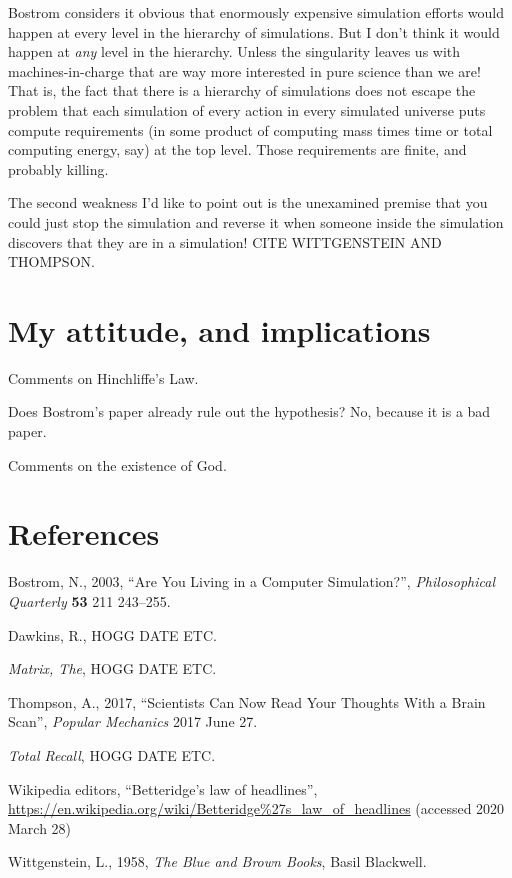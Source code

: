\documentclass[12pt,letterpaper]{article}
\begin{document}
Bostrom considers it obvious that enormously expensive simulation
efforts would happen at every level in the hierarchy of
simulations. But I don't think it would happen at \emph{any} level in
the hierarchy. Unless the singularity leaves us with
machines-in-charge that are way more interested in pure science than
we are! That is, the fact that there is a hierarchy of simulations
does not escape the problem that each simulation of every action in
every simulated universe puts compute requirements (in some product of
computing mass times time or total computing energy, say) at the top
level. Those requirements are finite, and probably killing.

The second weakness I'd like to point out is the unexamined premise
that you could just stop the simulation and reverse it when someone
inside the simulation discovers that they are in a simulation! CITE
WITTGENSTEIN AND THOMPSON.

\section{My attitude, and implications}

Comments on Hinchliffe's Law.

Does Bostrom's paper already rule out the hypothesis? No, because it
is a bad paper.

Comments on the existence of God.

\section*{References}
\begin{trivlist}
\item Bostrom, N., 2003, ``Are You Living in a Computer Simulation?'',
  \textit{Philosophical Quarterly} \textbf{53} 211 243--255.
\item Dawkins, R., HOGG DATE ETC.
\item \textit{Matrix, The}, HOGG DATE ETC.
\item Thompson, A., 2017, ``Scientists Can Now Read Your Thoughts With a Brain Scan'',
  \textit{Popular Mechanics} 2017 June 27.
\item \textit{Total Recall}, HOGG DATE ETC.
\item Wikipedia editors, ``Betteridge's law of headlines'',
  \url{https://en.wikipedia.org/wiki/Betteridge%27s_law_of_headlines}
    (accessed 2020 March 28)
\item Wittgenstein, L., 1958, \textit{The Blue and Brown Books},
  Basil Blackwell.
\end{trivlist}
\end{document}
